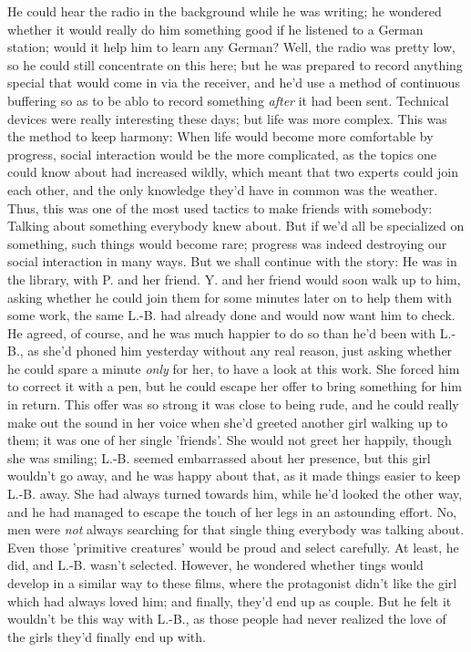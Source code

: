 He could hear the radio in the background while he was writing; he wondered whether it would really do him something good if he listened to a German station; would it help him to learn any German? Well, the radio was pretty low, so he could still concentrate on this here; but he was prepared to record anything special that would come in via the receiver, and he'd use a method of continuous buffering so as to be ablo to record something \emph{after} it had been sent. Technical devices were really interesting these days; but life was more complex. This was the method to keep harmony: When life would become more comfortable by progress, social interaction would be the more complicated, as the topics one could know about had increased wildly, which meant that two experts could join each other, and the only knowledge they'd have in common was the weather. Thus, this was one of the most used tactics to make friends with somebody: Talking about something everybody knew about. But if we'd all be specialized on something, such things would become rare; progress was indeed destroying our social interaction in many ways. 
But we shall continue with the story: He was in the library, with P. and her friend. Y. and her friend would soon walk up to him, asking whether he could join them for some minutes later on to help them with some work, the same L.-B. had already done and would now want him to check. He agreed, of course, and he was much happier to do so than he'd been with L.-B., as she'd phoned him yesterday without any real reason, just asking whether he could spare a minute \emph{only} for her, to have a look at this work. She forced him to correct it with a pen, but he could escape her offer to bring something for him in return. This offer was so strong it was close to being rude, and he could really make out the sound in her voice when she'd greeted another girl walking up to them; it was one of her single 'friends'. She would not greet her happily, though she was smiling; L.-B. seemed embarrassed about her presence, but this girl wouldn't go away, and he was happy about that, as it made things easier to keep L.-B. away. She had always turned towards him, while he'd looked the other way, and he had managed to escape the touch of her legs in an astounding effort. No, men were \emph{not} always searching for that single thing everybody was talking about. Even those 'primitive creatures' would be proud and select carefully. At least, he did, and L.-B. wasn't selected. 
However, he wondered whether tings would develop in a similar way to these films, where the protagonist didn't like the girl which had always loved him; and finally, they'd end up as couple. But he felt it wouldn't be this way with L.-B., as those people had never realized the love of the girls they'd finally end up with. 
